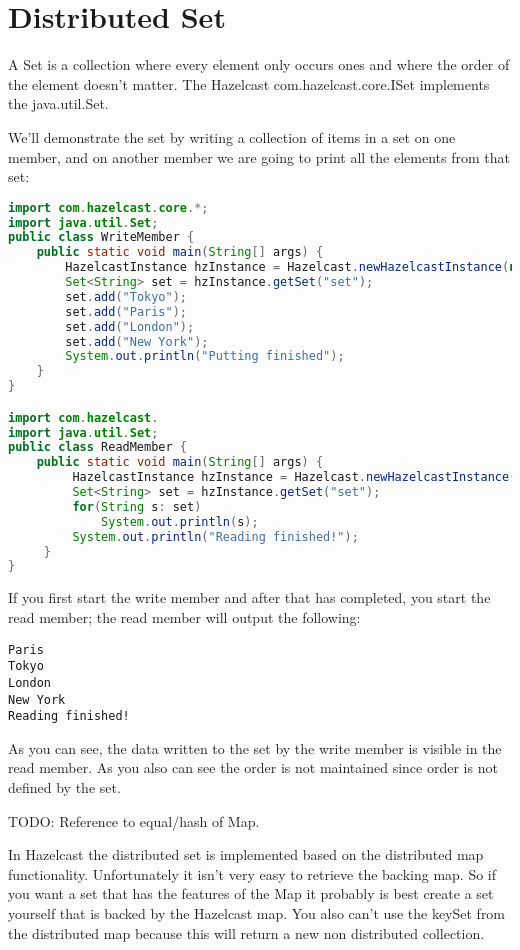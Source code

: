 \section{Distributed Set}
A Set is a collection where every element only occurs ones and where the order of the element doesn't matter. The Hazelcast com.hazelcast.core.ISet implements the java.util.Set.

We'll demonstrate the set by writing a collection of items in a set on one member, and on another member we are going to print all the elements from that set:
\begin{lstlisting}[language=java]
import com.hazelcast.core.*;
import java.util.Set;
public class WriteMember {
    public static void main(String[] args) {
        HazelcastInstance hzInstance = Hazelcast.newHazelcastInstance(null);
        Set<String> set = hzInstance.getSet("set");
        set.add("Tokyo");
        set.add("Paris");
        set.add("London");
        set.add("New York");
        System.out.println("Putting finished");
    }
}

import com.hazelcast.
import java.util.Set;
public class ReadMember {
    public static void main(String[] args) {
         HazelcastInstance hzInstance = Hazelcast.newHazelcastInstance(null);
         Set<String> set = hzInstance.getSet("set");
         for(String s: set)
             System.out.println(s);
         System.out.println("Reading finished!");
     }
}

\end{lstlisting}
If you first start the write member and after that has completed, you start the read member; the read member will output the following:
\begin{lstlisting}
Paris
Tokyo
London
New York
Reading finished!	
\end{lstlisting}
As you can see, the data written to the set by the write member is visible in the read member. As you also can see the order is not maintained since order is not defined by the set.

TODO: Reference to equal/hash of Map.

In Hazelcast the distributed set is implemented based on the distributed map functionality. Unfortunately it isn't very easy to retrieve the backing map. So if you want a set that has the features of the Map it probably is best create a set yourself that is backed by the Hazelcast map. You also can't use the keySet from the distributed map because this will return a new non distributed collection. 

